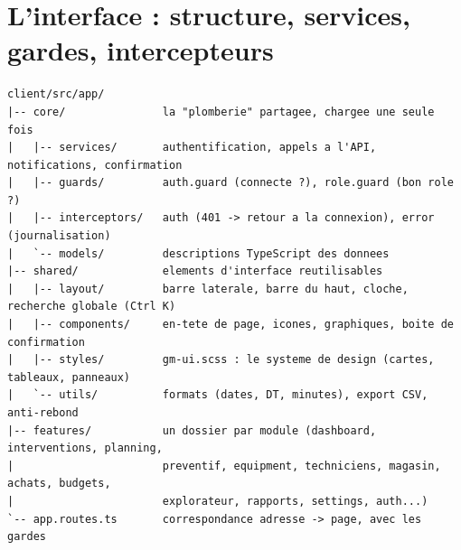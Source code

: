 \documentclass[11pt,a4paper]{article}
\begin{document}
\section{L'interface : structure, services, gardes, intercepteurs}

\begin{lstlisting}
client/src/app/
|-- core/               la "plomberie" partagee, chargee une seule fois
|   |-- services/       authentification, appels a l'API, notifications, confirmation
|   |-- guards/         auth.guard (connecte ?), role.guard (bon role ?)
|   |-- interceptors/   auth (401 -> retour a la connexion), error (journalisation)
|   `-- models/         descriptions TypeScript des donnees
|-- shared/             elements d'interface reutilisables
|   |-- layout/         barre laterale, barre du haut, cloche, recherche globale (Ctrl K)
|   |-- components/     en-tete de page, icones, graphiques, boite de confirmation
|   |-- styles/         gm-ui.scss : le systeme de design (cartes, tableaux, panneaux)
|   `-- utils/          formats (dates, DT, minutes), export CSV, anti-rebond
|-- features/           un dossier par module (dashboard, interventions, planning,
|                       preventif, equipment, techniciens, magasin, achats, budgets,
|                       explorateur, rapports, settings, auth...)
`-- app.routes.ts       correspondance adresse -> page, avec les gardes
\end{lstlisting}
\end{document}
